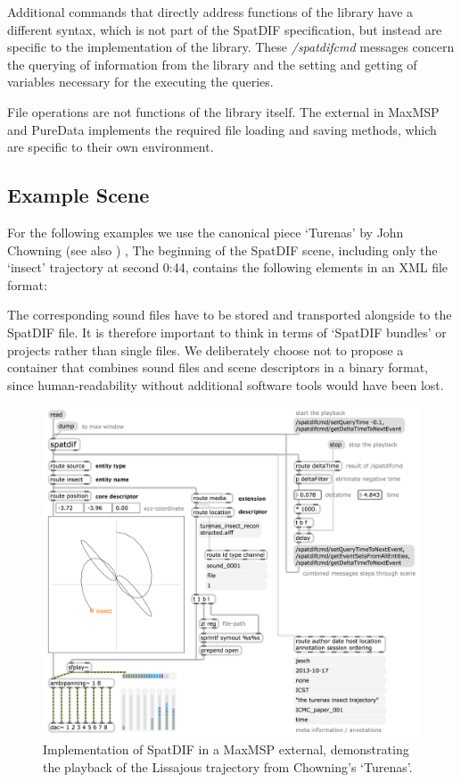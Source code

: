 \documentclass{article}
\begin{document}
Additional commands that directly address functions of the library have a different syntax, which is not part of the SpatDIF specification, but instead are specific to the implementation of the library.
These \emph{/spatdifcmd} messages concern the querying of information from the library and the setting and getting of variables necessary for the executing the queries.

File operations are not functions of the library itself.
The external in MaxMSP and PureData implements the required file loading and saving methods, which are specific to their own environment. 
  
\subsection{Example Scene}\label{sec:examples}

For the following examples we use the canonical piece `Turenas' by John Chowning \cite{chowningturenas} (see also \cite{Peters:2013SpatDifCMJ}) , 
The beginning of the SpatDIF scene, including only the `insect' trajectory at second 0:44, contains the following elements in an XML file format:

 

The corresponding sound files have to be stored and transported alongside to the SpatDIF file.
It is therefore important to think in terms of ‘SpatDIF bundles’ or projects rather than single files. 
We deliberately choose not to propose a container that combines sound files and scene descriptors in a binary format, since human-readability without additional software tools would have been lost. 
 
\begin{figure}[httb]
	\centering
	\includegraphics[width=\columnwidth]{playback_maxpatch.png}
	\caption{Implementation of SpatDIF in a MaxMSP external, demonstrating the playback of the Lissajous trajectory from Chowning's `Turenas'.} 
	\label{fig:screenshot}
\end{figure}
\end{document}

